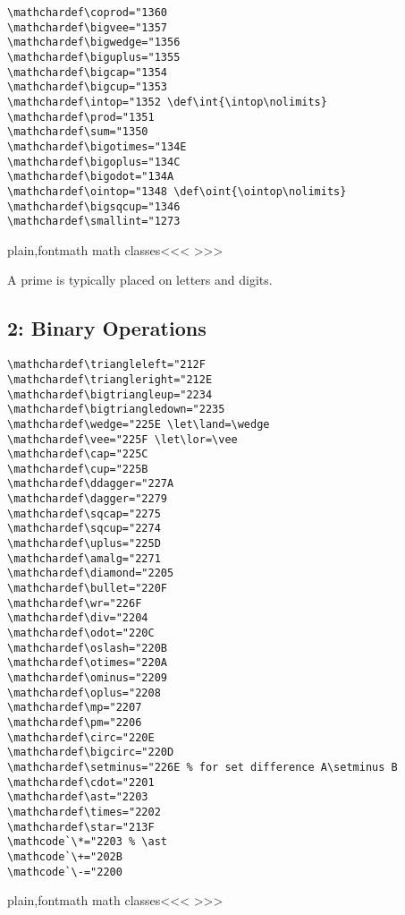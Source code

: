 {{{{{{\begin{verbatim}
\mathchardef\coprod="1360
\mathchardef\bigvee="1357
\mathchardef\bigwedge="1356
\mathchardef\biguplus="1355
\mathchardef\bigcap="1354
\mathchardef\bigcup="1353
\mathchardef\intop="1352 \def\int{\intop\nolimits}
\mathchardef\prod="1351
\mathchardef\sum="1350
\mathchardef\bigotimes="134E
\mathchardef\bigoplus="134C
\mathchardef\bigodot="134A
\mathchardef\ointop="1348 \def\oint{\ointop\nolimits}
\mathchardef\bigsqcup="1346
\mathchardef\smallint="1273
\end{verbatim}

\<plain,fontmath math classes\><<<
>>>


A prime is typically  placed on letters and digits.


\subsection{2: Binary Operations}

\begin{verbatim}
\mathchardef\triangleleft="212F
\mathchardef\triangleright="212E
\mathchardef\bigtriangleup="2234
\mathchardef\bigtriangledown="2235
\mathchardef\wedge="225E \let\land=\wedge
\mathchardef\vee="225F \let\lor=\vee
\mathchardef\cap="225C
\mathchardef\cup="225B
\mathchardef\ddagger="227A
\mathchardef\dagger="2279
\mathchardef\sqcap="2275
\mathchardef\sqcup="2274
\mathchardef\uplus="225D
\mathchardef\amalg="2271
\mathchardef\diamond="2205
\mathchardef\bullet="220F
\mathchardef\wr="226F
\mathchardef\div="2204
\mathchardef\odot="220C
\mathchardef\oslash="220B
\mathchardef\otimes="220A
\mathchardef\ominus="2209
\mathchardef\oplus="2208
\mathchardef\mp="2207
\mathchardef\pm="2206
\mathchardef\circ="220E
\mathchardef\bigcirc="220D
\mathchardef\setminus="226E % for set difference A\setminus B
\mathchardef\cdot="2201
\mathchardef\ast="2203
\mathchardef\times="2202
\mathchardef\star="213F
\mathcode`\*="2203 % \ast
\mathcode`\+="202B
\mathcode`\-="2200
\end{verbatim}

\<plain,fontmath math classes\><<<
>>>


}}}}}}
